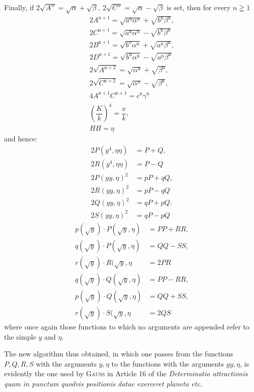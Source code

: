 Finally, if $2\surd {A''}=\surd \alpha+\surd \beta,\allowbreak \ 2\surd {C''}=\surd \alpha-\surd \beta$ is set, then for every $n\geqq1$
\[
\begin{gathered}
2A^{\mathrm n+1}=\surd {a^{\mathrm n}\alpha^{\mathrm n}}+\surd {b^{\mathrm n}\beta^{\mathrm n}},\\[7pt]
2C^{\mathrm n+1}=\surd {a^{\mathrm n}\alpha^{\mathrm n}}-\surd {b^{\mathrm n}\beta^{\mathrm n}}\\[7pt]
2B^{\mathrm n+1}=\surd {b^{\mathrm n}\alpha^{\mathrm n}}+\surd {a^{\mathrm n}\beta^{\mathrm n}},\\[7pt]
2D^{\mathrm n+1}=\surd {b^{\mathrm n}\alpha^{\mathrm n}}-\surd {a^{\mathrm n}\beta^{\mathrm n}}\\[7pt]
2\surd {A^{\mathrm n+2}}=\surd {\alpha^{\mathrm n}}+\surd {\beta^{\mathrm n}},\\[7pt]
2\surd {C^{\mathrm n+2}}=\surd {\alpha^{\mathrm n}}-\surd {\beta^{\mathrm n}},\\[7pt]
4A^{\mathrm n+1}C^{\mathrm n+1}=c^{\mathrm n}\gamma^{\mathrm n}\\[7pt]
\left(\dfrac Kk\right)^4=\dfrac{x}k,\\[7pt] HH=\eta
\end{gathered}
\]
and hence:
\[
\begin{aligned}
2P(y^4,\eta\eta)&=P+Q,\\[6pt]2R(y^4,\eta\eta)&=P-Q\\[6pt]
2P(yy,\eta)^2&=pP+qQ,\\[6pt]2R(yy,\eta)^2&=pP-qQ\\[6pt]
2Q(yy,\eta)^2&=qP+pQ.\\[6pt]2S(yy,\eta)^2&=qP-pQ
\end{aligned}
\]
\[
\begin{aligned}
p(\surd  y)\cdot P(\surd  y,\eta)&=PP+RR,\\[6pt]
q(\surd  y)\cdot P(\surd  y,\eta)&=QQ-SS,\\[6pt]
r(\surd  y)\cdot R(\surd  y,\eta&=2PR\\[6pt]
q(\surd  y)\cdot Q(\surd  y,\eta)&=PP-RR,\\[6pt]
p(\surd  y)\cdot Q(\surd  y,\eta)&=QQ+SS,\\[6pt]
r(\surd  y)\cdot S(\surd  y,\eta&=2QS
\end{aligned}
\]
where once again those functions to which no arguments are appended refer to the simple $y$ and $\eta$.

The new algorithm thus obtained, in which one passes from the functions $P,\allowbreak Q,\allowbreak R,\allowbreak S$ with the arguments $y,\allowbreak \eta$ to the functions with the arguments $yy,\allowbreak \eta$, is evidently the one used by \textsc{Gauss} in Article 16 of the \textit{Determinatio attractionis quam in punctum quodvis positionis datae exerceret planeta etc.}

